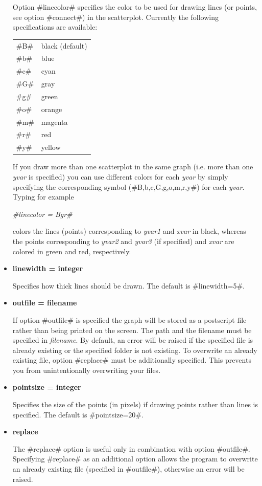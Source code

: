 \begin{itemize}
Option #linecolor# specifies the color to be used for drawing
lines (or points, see option #connect#) in the scatterplot.
Currently the following specifications are available:

\begin{tabular}{ll}
#B# & black (default) \\
#b# & blue \\
#c# & cyan \\
#G# & gray \\
#g# & green \\
#o# & orange \\
#m# & magenta \\
#r# & red \\
#y# & yellow \\
\end{tabular}

If you draw more than one scatterplot in the same graph (i.e. more
than one {\em yvar} is specified) you can use different colors for
each {\em yvar} by simply specifying the corresponding symbol
(#B,b,c,G,g,o,m,r,y#) for each {\em yvar}. Typing for example

{\em #linecolor = Bgr#}

colors the lines (points) corresponding to {\em yvar1} and {\em
xvar} in black, whereas the points corresponding to {\em yvar2}
and {\em yvar3} (if specified) and {\em xvar} are colored in green
and red, respectively.
\item {\bf linewidth = integer}

Specifies how thick lines should be drawn. The default is
#linewidth=5#.
\item {\bf outfile = filename}

If option #outfile# is specified the graph will be stored as a
postscript file rather than being printed on the screen. The path
and the filename must be specified in {\em filename}. By default,
an error will be raised if the specified file is already existing
or the specified folder is not existing. To overwrite  an already
existing file, option #replace# must be additionally specified.
This prevents you from unintentionally overwriting your files.
\item {\bf pointsize = integer}

Specifies the size of the points (in pixels) if drawing points
rather than lines is specified. The default is #pointsize=20#.

\item {\bf replace}

The #replace# option is useful only in combination with option
#outfile#. Specifying #replace# as an additional option allows the
program to overwrite an already existing file (specified in
#outfile#), otherwise an error will be raised.


\end{itemize}
